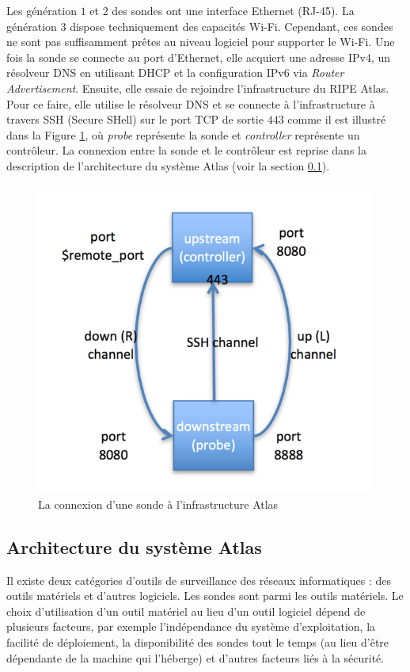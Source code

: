 Les génération $1$ et $2$ des sondes  ont une interface Ethernet (RJ-45). La génération $3$ dispose techniquement des capacités Wi-Fi. Cependant, ces sondes ne sont pas suffisamment prêtes au niveau logiciel pour supporter le Wi-Fi.
Une fois la sonde se connecte au port d'Ethernet, elle acquiert  une adresse IPv4, un résolveur DNS  en utilisant DHCP et la configuration IPv6 via \textit{Router Advertisement}. Ensuite, elle essaie de rejoindre l'infrastructure du RIPE Atlas. Pour ce faire, elle utilise le résolveur DNS et se connecte à l'infrastructure à travers SSH (Secure SHell) sur le port TCP de sortie $443$ comme il est illustré dans la Figure \ref{fig:ssh-atlas-probe}, où \textit{probe} représente la sonde et \textit{controller} représente un contrôleur. La connexion entre la sonde et le contrôleur  est  reprise dans la description de  l'architecture du système Atlas (voir la section \ref{subsec:archi-probes}). 

\begin{figure}[h]
	\centering
	\captionsetup{justification=centering}
	\includegraphics[width=0.5\linewidth]{illustrations/ssh-atlas-probe}
	\caption{La connexion d'une sonde  à l'infrastructure  Atlas \cite{how-we-manage-our-probe}}
	\label{fig:ssh-atlas-probe}
\end{figure}

\subsection{Architecture du système Atlas} \label{subsec:archi-probes}

Il existe deux catégories d'outils de surveillance des réseaux informatiques : des outils matériels et d'autres logiciels. Les sondes   sont parmi les outils matériels. Le choix d'utilisation d'un outil matériel au lieu d'un outil logiciel dépend de plusieurs facteurs, par exemple l'indépendance du système d'exploitation, la facilité de déploiement, la disponibilité des sondes tout le temps (au lieu d'être dépendante de la machine qui l'héberge) et d'autres facteurs liés à la sécurité.

